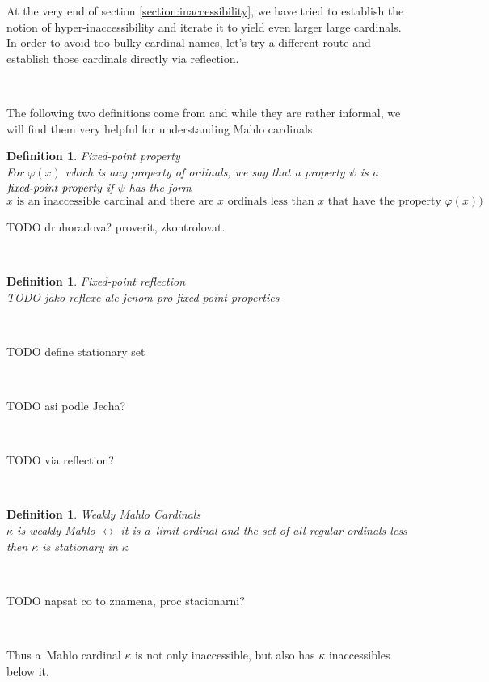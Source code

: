 \documentclass[12pt,a4paper]{article}
\newtheorem{definition}[theorem]{Definition}
\renewcommand{\iff}{\leftrightarrow}
\begin{document}
At the very end of section \ref{section:inaccessibility}, we have tried to establish the notion of hyper-inaccessibility and iterate it to yield even larger large cardinals. In order to avoid too bulky cardinal names, let's try a different route and establish those cardinals directly via reflection.

\

The following two definitions come from \cite{Infinity_in_mind} and while they are rather informal, we will find them very helpful for understanding Mahlo cardinals.
\begin{definition}{Fixed-point property}\\
For $\varphi(x)$ which is any property of ordinals, we say that a property $\psi$ is a $\emph{fixed-point property}$ if $\psi$ has the form
\begin{equation}
\mbox{$x$ is an inaccessible cardinal and there are $x$ ordinals less than $x$ that have the property $\varphi(x)$)}
\end{equation}
\end{definition}

TODO druhoradova? proverit, zkontrolovat.

\

\begin{definition}{Fixed-point reflection}\\
TODO jako reflexe ale jenom pro fixed-point properties
\end{definition}

\

TODO define stationary set

\

TODO asi podle Jecha?

\

TODO via reflection?

\

\begin{definition}{Weakly Mahlo Cardinals}\label{def:weakly_mahlo}\\
$\kappa$ is \emph{weakly Mahlo} $\iff$ it is a~limit ordinal and the set of all regular ordinals less then $\kappa$ is stationary in $\kappa$
\end{definition}

\

TODO napsat co to znamena, proc stacionarni?

\

Thus a~Mahlo cardinal $\kappa$ is not only inaccessible, but also has $\kappa$ inaccessibles below it.
\end{document}
